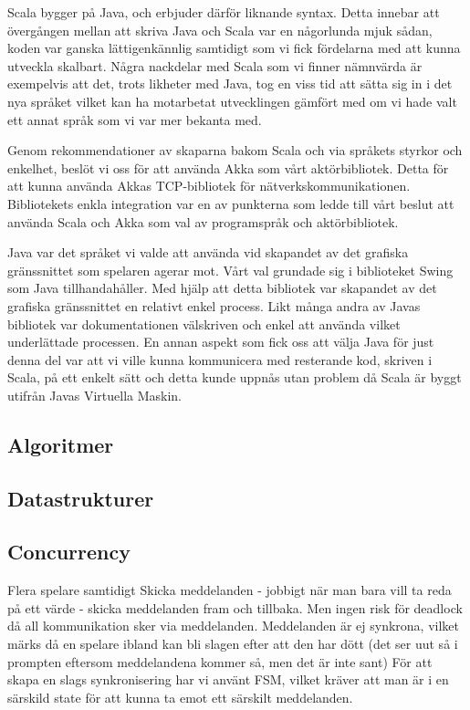 \documentclass[a4paper]{article}
\begin{document}
Scala bygger på Java, och erbjuder därför liknande syntax. Detta innebar att övergången mellan att skriva Java och Scala var en någorlunda mjuk sådan, koden var ganska lättigenkännlig samtidigt som vi fick fördelarna med att kunna utveckla skalbart. Några nackdelar med Scala som vi finner nämnvärda är exempelvis att det, trots likheter med Java, tog en viss tid att sätta sig in i det nya 
språket vilket kan ha motarbetat utvecklingen gämfört med om vi hade valt ett annat språk som vi var mer bekanta med.

Genom rekommendationer av skaparna bakom Scala och via språkets styrkor och enkelhet, beslöt vi oss för 
att använda Akka som vårt aktörbibliotek. Detta för att kunna använda Akkas TCP-bibliotek för nätverkskommunikationen. Bibliotekets enkla integration var en av punkterna som ledde till vårt beslut att använda Scala och Akka som val av programspråk och aktörbibliotek.

Java var det språket vi valde att använda vid skapandet av det grafiska gränssnittet som spelaren agerar mot. Vårt val grundade sig i biblioteket Swing som Java tillhandahåller. 
Med hjälp att detta bibliotek var skapandet av det grafiska gränssnittet en relativt enkel process. Likt många andra av Javas bibliotek var dokumentationen välskriven och enkel 
att använda vilket underlättade processen. En annan aspekt som fick oss att välja Java för just denna del var att vi ville kunna kommunicera med resterande kod, skriven i Scala, 
på ett enkelt sätt och detta kunde uppnås utan problem då Scala är byggt utifrån Javas Virtuella Maskin. 

\subsection{Algoritmer}

\subsection{Datastrukturer}

\subsection{Concurrency}
Flera spelare samtidigt
Skicka meddelanden - jobbigt när man bara vill ta reda på ett värde - skicka meddelanden fram och tillbaka. Men ingen risk för deadlock då all kommunikation sker via meddelanden. 
Meddelanden är ej synkrona, vilket märks då en spelare ibland kan bli slagen efter att den har dött (det ser uut så i prompten eftersom meddelandena kommer så, men det är inte sant)
För att skapa en slags synkronisering har vi använt FSM, vilket kräver att man är i en särskild state för att kunna ta emot ett särskilt meddelanden. 
\end{document}
